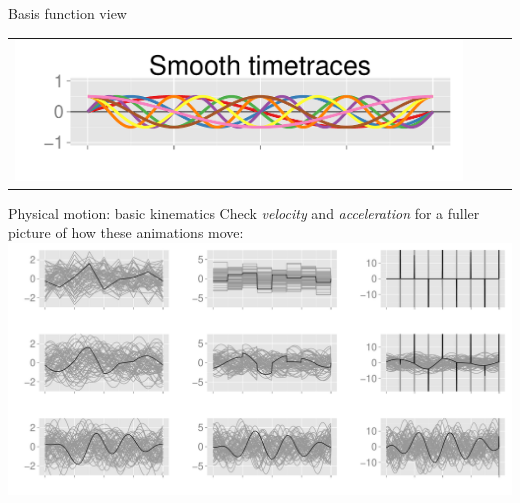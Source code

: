 \documentclass[final,t]{beamer}\usepackage[]{graphicx}\usepackage[]{color}
\makeatletter
\def\maxwidth{ %
  \ifdim\Gin@nat@width>\linewidth
    \linewidth
  \else
    \Gin@nat@width
  \fi
}
\newenvironment{knitrout}{}{} %
\newcommand{\cmark}{\ding{51}}%
\newcommand{\xmark}{\ding{55}}%
\makeatother
\begin{document}
\begin{frame}[fragile]
\begin{columns}[T,onlytextwidth]
\begin{column}{.32\linewidth}
\begin{block}{Basis function view}
\begin{table}
\begin{tabular}{|l|c|c|c|}
\begin{knitrout}
\end{knitrout}

            & {\Huge \color{green}{\cmark}} & {\Huge \color{red}{\xmark}} &
            {\Huge \color{red}{\xmark}} \\
            \hline
\begin{knitrout}
\definecolor{shadecolor}{rgb}{0.969, 0.969, 0.969}\color{fgcolor}
\includegraphics[width=\maxwidth]{figure/basis_smooth} 

\end{knitrout}

            & {\Huge \color{green}{\cmark}} & {\Huge \color{green}{\cmark}} &
            {\Huge \color{green}{\cmark}} \\
            \hline
          \end{tabular}
        \end{table}

      \end{block}

      \begin{block}{Physical motion: basic kinematics}
        {\small Check \textit{velocity} and \textit{acceleration} for a
        fuller picture of how these animations move:} \\
\begin{knitrout}
\color{fgcolor}
\includegraphics[width=\maxwidth]{figure/kinematics} 


\end{knitrout}
\end{block}
\end{column}
\end{columns}
\end{frame}
\end{document}
